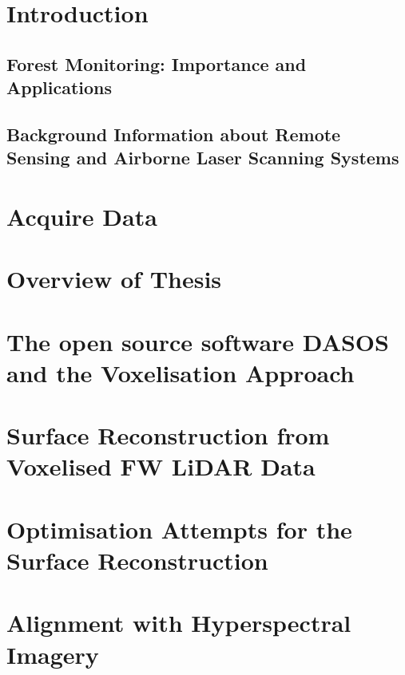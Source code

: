 \documentclass[11pt,nofootinbib]{report}
\begin{document}
	\chapter{Introduction} \label{Introduction} 	
		\section{Forest Monitoring: Importance and Applications}\label{sec:forestMonitoring}
		
		\section{Background Information about Remote Sensing and Airborne Laser Scanning Systems}\label{Background}
			
			\newpage
		
    \chapter{Acquire Data}\label{AcquireData}
		 
	    \newpage
	\chapter{Overview of Thesis}\label{PipeLine}
		

	\chapter{The open source software DASOS and the Voxelisation Approach}\label{DASOS_Voxelisation}
			
	\newpage


		 		
	\chapter{Surface Reconstruction from Voxelised FW LiDAR Data}\label{Visualisations}
		

		\newpage
    \chapter{Optimisation Attempts for the Surface Reconstruction}\label{Optimisations}
       
			 \newpage
	\chapter{Alignment with Hyperspectral Imagery}\label{Alignment}
		
		\newpage		
\end{document}

